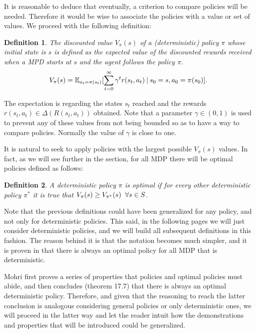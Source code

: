 \documentclass[12pt]{article}
\newtheorem{definition}{Definition}[section]
\numberwithin{equation}{section}
\begin{document}
 It is reasonable to deduce that eventually, a criterion to compare policies will be needed.  Therefore it would be wise to associate the policies with a value or set of values.  We proceed with the following definition:


\begin{definition}
    The discounted value $V_{\pi}(s)$  of a (deterministic) policy $\pi$ whose initial state is $s$  is defined as the expected value of the discounted rewards received when a MPD starts at $s$ and the agent follows the policy $\pi$.
    \begin{equation}
        V_{\pi}(s)=\mathbb{E}_{a_t=\pi(s_t)}[\sum_{t=0}^{\infty}\gamma^t r(s_t,a_t) \hspace{0.75mm} |\hspace{0.75mm} s_0=s , a_0=\pi(s_0)].
    \end{equation}
\end{definition}


  The expectation is regarding the states $s_t$ reached and the rewards $ r(s_t,a_t)\in \Delta (R(s_t,a_t)) $ obtained. Note that a parameter $\gamma \in (0,1) $  is used to prevent any of these values from not being bounded so as to have a way to compare policies. Normally the value of $\gamma$ is close to one.


It is natural to seek to apply policies with the largest possible $V_{\pi}(s)$ values. In fact, as we will see further in the section, for all MDP there will be optimal policies defined as follows:



\begin{definition}
  A  deterministic policy $\pi$ is optimal if  for every other deterministic policy $\pi^{*}$ it is true that $V_{\pi}(s) \geq V_{\pi^*}(s) \hspace{2mm}\forall s\in S$.
   
\end{definition}




Note that the previous definitions could have been generalized for any policy, and not only for deterministic policies. This said, in the following pages we will just consider deterministic policies, and we will build all subsequent definitions in this fashion. The reason behind it is that the notation becomes much simpler, and it is proven in \cite{mohri2018foundations} that there is always an optimal policy for all MDP that is deterministic. 


Mohri first proves a series of properties that policies and optimal policies must abide,  and then concludes (theorem 17.7\cite{mohri2018foundations}) that there is always an optimal deterministic policy. Therefore, and given that the reasoning to reach the latter conclusion is analogous considering general policies or only deterministic ones, we will proceed in the latter way and let the reader intuit how the demonstrations and properties that will be introduced could be generalized.
\end{document}

